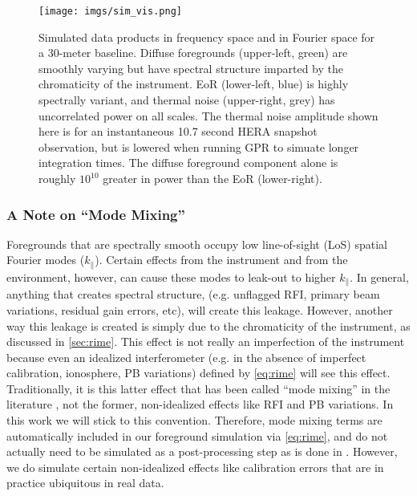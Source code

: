 \documentclass[a4paper,fleqn,usenatbib]{mnras}
\def\para{\parallel}
\begin{document}
\begin{figure}
\centering
\texttt{[image: imgs/sim\_vis.png]}
\caption{Simulated data products in frequency space and in Fourier space for a 30-meter baseline. Diffuse foregrounds (upper-left, green) are smoothly varying but have spectral structure imparted by the chromaticity of the instrument. EoR (lower-left, blue) is highly spectrally variant, and thermal noise (upper-right, grey) has uncorrelated power on all scales. The thermal noise amplitude shown here is for an instantaneous 10.7 second HERA snapshot observation, but is lowered when running GPR to simuate longer integration times. The diffuse foreground component alone is roughly $10^10$ greater in power than the EoR (lower-right).}
\label{fig:sim_vis}
\end{figure}

\subsubsection{A Note on ``Mode Mixing''}
Foregrounds that are spectrally smooth occupy low line-of-sight (LoS) spatial Fourier modes ($k_\para$).
Certain effects from the instrument and from the environment, however, can cause these modes to leak-out to higher $k_\para$.
In general, anything that creates spectral structure, (e.g. unflagged RFI, primary beam variations, residual gain errors, etc), will create this leakage.
However, another way this leakage is created is simply due to the chromaticity of the instrument, as discussed in \autoref{sec:rime}.
This effect is not really an imperfection of the instrument because even an idealized interferometer (e.g. in the absence of imperfect calibration, ionosphere, PB variations) defined by \autoref{eq:rime} will see this effect.
Traditionally, it is this latter effect that has been called ``mode mixing'' in the literature \citep{Datta, Morales}, not the former, non-idealized effects like RFI and PB variations.
In this work we will stick to this convention.
Therefore, mode mixing terms are automatically included in our foreground simulation via \autoref{eq:rime}, and do not actually need to be simulated as a post-processing step as is done in \citet{M19}.
However, we do simulate certain non-idealized effects like calibration errors that are in practice ubiquitous in real data.
\end{document}
